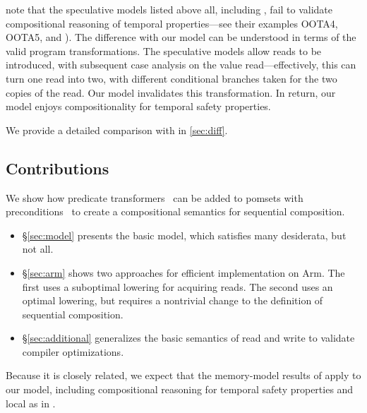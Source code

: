 \citet{DBLP:journals/pacmpl/JagadeesanJR20} note that the speculative models
listed above all, including \cite{DBLP:conf/popl/KangHLVD17}, fail to
validate compositional reasoning of temporal properties---see their examples
OOTA4, OOTA5, and \citep[Fig.~8]{DBLP:journals/toplas/Lochbihler13}).  The
difference with our model can be understood in terms of the valid program
transformations.  The speculative models allow reads to be introduced, with
subsequent case analysis on the value read---effectively, this can turn one
read into two, with different conditional branches taken for the two copies
of the read.  Our model invalidates this transformation.  In return, our
model enjoys compositionality for temporal safety properties.

We provide a detailed comparison with
\cite{DBLP:journals/pacmpl/JagadeesanJR20} in \textsection\ref{sec:diff}.

\subsection{Contributions}

We show how predicate transformers~\cite{DBLP:journals/cacm/Dijkstra75} can
be added to pomsets with
preconditions~\cite{DBLP:journals/pacmpl/JagadeesanJR20} to create a
compositional semantics for sequential composition.
\begin{itemize}
\item \S\ref{sec:model} presents the basic model, which satisfies many
  desiderata, but not all.
\item \S\ref{sec:arm} shows two approaches for efficient implementation on
  Arm.  The first uses a suboptimal lowering for acquiring reads.  The second
  uses an optimal lowering, but requires a nontrivial change to the
  definition of sequential composition.
\item \S\ref{sec:additional} generalizes the basic semantics of read and write
  to validate compiler optimizations.
\end{itemize}
Because it is closely related, we expect that the memory-model results of
\cite{DBLP:journals/pacmpl/JagadeesanJR20} apply to our model, including
compositional reasoning for temporal safety properties and {local} \drfsc{}
as in \cite{Dolan:2018:BDR:3192366.3192421,DBLP:conf/ppopp/DongolJR19,promising-ldrf}.

